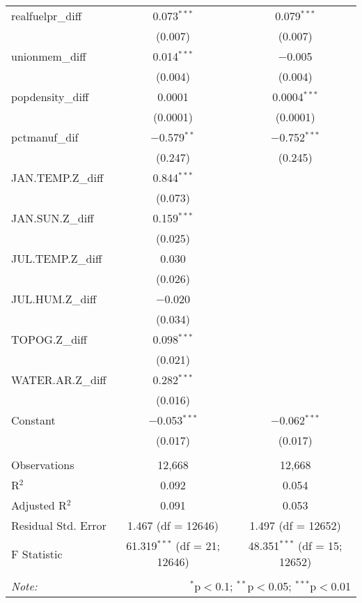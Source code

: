 \begin{table}[!htbp]
\begin{tabular}{@{\extracolsep{5pt}}lcc}
  realfuelpr\_diff & 0.073$^{***}$ & 0.079$^{***}$ \\ 
  & (0.007) & (0.007) \\ 
  unionmem\_diff & 0.014$^{***}$ & $-$0.005 \\ 
  & (0.004) & (0.004) \\ 
  popdensity\_diff & 0.0001 & 0.0004$^{***}$ \\ 
  & (0.0001) & (0.0001) \\ 
  pctmanuf\_dif & $-$0.579$^{**}$ & $-$0.752$^{***}$ \\ 
  & (0.247) & (0.245) \\ 
  JAN.TEMP.Z\_diff & 0.844$^{***}$ &  \\ 
  & (0.073) &  \\ 
  JAN.SUN.Z\_diff & 0.159$^{***}$ &  \\ 
  & (0.025) &  \\ 
  JUL.TEMP.Z\_diff & 0.030 &  \\ 
  & (0.026) &  \\ 
  JUL.HUM.Z\_diff & $-$0.020 &  \\ 
  & (0.034) &  \\ 
  TOPOG.Z\_diff & 0.098$^{***}$ &  \\ 
  & (0.021) &  \\ 
  WATER.AR.Z\_diff & 0.282$^{***}$ &  \\ 
  & (0.016) &  \\ 
  Constant & $-$0.053$^{***}$ & $-$0.062$^{***}$ \\ 
  & (0.017) & (0.017) \\ 
 \hline \\[-1.8ex] 
Observations & 12,668 & 12,668 \\ 
R$^{2}$ & 0.092 & 0.054 \\ 
Adjusted R$^{2}$ & 0.091 & 0.053 \\ 
Residual Std. Error & 1.467 (df = 12646) & 1.497 (df = 12652) \\ 
F Statistic & 61.319$^{***}$ (df = 21; 12646) & 48.351$^{***}$ (df = 15; 12652) \\ 
\hline 
\hline \\[-1.8ex] 
\textit{Note:}  & \multicolumn{2}{r}{$^{*}$p$<$0.1; $^{**}$p$<$0.05; $^{***}$p$<$0.01} \\ 
\end{tabular} 
\end{table} 
